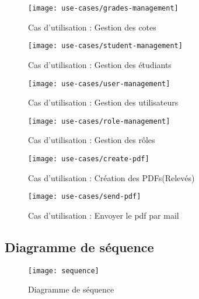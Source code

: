 \begin{figure}[ht]
    \caption{Cas d'utilisation : Gestion des cotes}
    \texttt{[image: use-cases/grades-management]}
    \centering
    \label{fig:grades-management}
\end{figure}
\pagebreak

\begin{figure}[ht]
    \caption{Cas d'utilisation : Gestion des étudiants}
    \texttt{[image: use-cases/student-management]}
    \centering
    \label{fig:student-management}
\end{figure}
\pagebreak

\begin{figure}[ht]
    \caption{Cas d'utilisation : Gestion des utilisateurs}
    \texttt{[image: use-cases/user-management]}
    \centering
    \label{fig:user-management}
\end{figure}
\pagebreak

\begin{figure}[ht]
    \caption{Cas d'utilisation : Gestion des rôles}
    \texttt{[image: use-cases/role-management]}
    \centering
    \label{fig:role-management}
\end{figure}
\pagebreak

\begin{figure}[ht]
    \caption{Cas d'utilisation : Création des PDFs(Relevés)}
    \texttt{[image: use-cases/create-pdf]}
    \centering
    \label{fig:create-pdf}
\end{figure}
\pagebreak

\begin{figure}[ht]
    \caption{Cas d'utilisation : Envoyer le pdf par mail}
    \texttt{[image: use-cases/send-pdf]}
    \centering
    \label{fig:send-pdf}
\end{figure}
\pagebreak

\subsection{Diagramme de séquence}\label{subsec:conception-sequence-diagram}
\begin{figure}[ht]
    \centering
    \caption{Diagramme de séquence}
    \texttt{[image: sequence]}
    \label{fig:sequence-diagram}
\end{figure}
\pagebreak